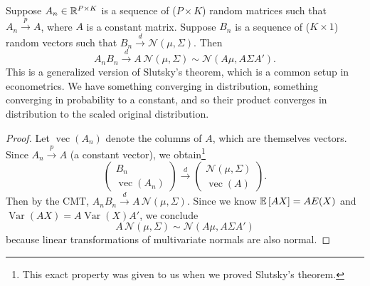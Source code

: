 \begin{proposition}
	Suppose $A_n \in \mathbb{R}^{P \times K}$ is a sequence of ($P\times K$) random matrices such that $A_n\xrightarrow{p}A$, where $A$ is a constant matrix. Suppose $B_n$ is a sequence of ($K\times 1$) random vectors such that $B_n\xrightarrow{d}\mathcal{N}(\mu,\Sigma)$. Then
	\[
		A_nB_n\xrightarrow{d}A\,\mathcal{N}(\mu,\Sigma)\sim\mathcal{N}(A\mu,A\Sigma A').
	\]
	This is a generalized version of Slutsky's theorem, which is a common setup in econometrics. We have something converging in distribution, something converging in probability to a constant, and so their product converges in distribution to the scaled original distribution.
\end{proposition}

\begin{proof}
	Let $\operatorname{vec}(A_n)$ denote the columns of $A$, which are themselves vectors. Since $A_n \xrightarrow{p} A$ (a constant vector), we obtain\footnote{This exact property was given to us when we proved Slutsky's theorem.}
	\[
		\begin{pmatrix}
			B_n \\
			\operatorname{vec}(A_n)
		\end{pmatrix}
		\xrightarrow{d}
		\begin{pmatrix}
			\mathcal{N}(\mu,\Sigma) \\
			\operatorname{vec}(A)
		\end{pmatrix}.
	\]
	Then by the CMT, $A_nB_n\xrightarrow{d}A\,\mathcal{N}(\mu,\Sigma)$. Since we know $\mathbb{E}\left[AX\right]=AE(X)$ and $\operatorname{Var}(AX)=A\operatorname{Var}(X)A'$, we conclude
	\[
		A\,\mathcal{N}(\mu,\Sigma)\sim\mathcal{N}(A\mu,A\Sigma A')
	\]
	because linear transformations of multivariate normals are also normal.
\end{proof}

